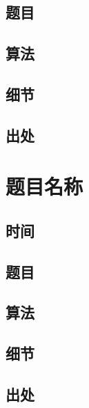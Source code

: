 \documentclass[a4paper]{article}
\begin{document}
		
		
	\subsection{题目}
		
		
		
	\subsection{算法}
		
		
		
	\subsection{细节}
		
		
		
	\subsection{出处}
		
		
	
	\newpage
	
	\section{题目名称}
		
	\subsection{时间}
		
		
		
	\subsection{题目}
		
		
		
	\subsection{算法}
		
		
		
	\subsection{细节}
		
		
		
	\subsection{出处}
		
\end{document}
